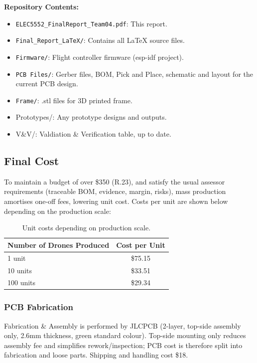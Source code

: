 \textbf{Repository Contents:}
\begin{itemize}
    \item \texttt{ELEC5552\_FinalReport\_Team04.pdf}: This report.
    \item \texttt{Final\_Report\_LaTeX/}: Contains all \LaTeX{} source files.
    \item \texttt{Firmware/}: Flight controller firmware (\gls{esp-idf} project).
    \item \texttt{PCB Files/}: Gerber files, BOM, Pick and Place, schematic and layout for the current PCB design.
    \item \texttt{Frame/}: .stl files for 3D printed frame.
    \item Prototypes/: Any prototype designs and outputs.
    \item V\&V/: Valdiation \& Verification table, up to date.
\end{itemize}

\pagebreak
\subsection{Final Cost}

To maintain a budget of over \$350 (R.23), and satisfy the usual assessor requirements (traceable BOM, evidence, margin, risks), mass production amortises one-off fees, lowering unit cost. Costs per unit are shown below depending on the production scale:

\begin{table}[H]
\centering
\begin{tabular}{l c}
\toprule
\textbf{Number of Drones Produced} & \textbf{Cost per Unit} \\
\midrule
1 unit   & \$75.15 \\
10 units & \$33.51 \\
100 units & \$29.34 \\
\bottomrule
\end{tabular}
\caption{Unit costs depending on production scale.}
\end{table}

\subsubsection{PCB Fabrication}

Fabrication \& Assembly is performed by JLCPCB (2-layer, top-side assembly only, 2.6mm thickness, green standard colour). Top-side mounting only reduces assembly fee and simplifies rework/inspection; PCB cost is therefore split into fabrication and loose parts. Shipping and handling cost \$18.

